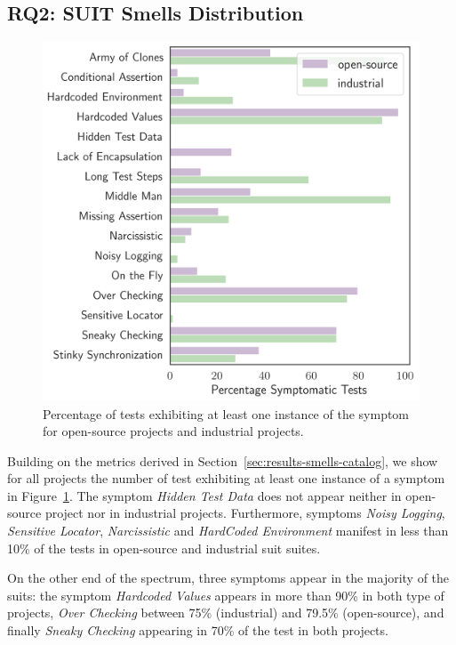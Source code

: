\subsection{RQ2: SUIT Smells Distribution}
\label{sec:results-smells-diffusion}

\begin{figure}
\centering
\includegraphics[width=0.9\linewidth]{figures/smells/diffusion.png}
\caption{Percentage of tests exhibiting at least one instance of the symptom for open-source projects and industrial projects.}  
\label{fig:diffusion}
\end{figure}

Building on the metrics derived in Section~\ref{sec:results-smells-catalog}, we show for all projects the number of test exhibiting at least one instance of a symptom in Figure~\ref{fig:diffusion}. The symptom \emph{Hidden Test Data} does not appear neither in open-source project nor in industrial projects. Furthermore, symptoms \emph{Noisy Logging}, \emph{Sensitive Locator}, \emph{Narcissistic} and \emph{HardCoded Environment} manifest in less than 10\% of the tests in open-source and industrial \gls{suit} suites. 

On the other end of the spectrum, three symptoms appear in the majority of the \gls{suit}s: the symptom \emph{Hardcoded Values} appears in more than 90\% in both type of projects, \emph{Over Checking} between 75\% (industrial) and 79.5\% (open-source), and finally \emph{Sneaky Checking} appearing in 70\% of the test in both projects.

